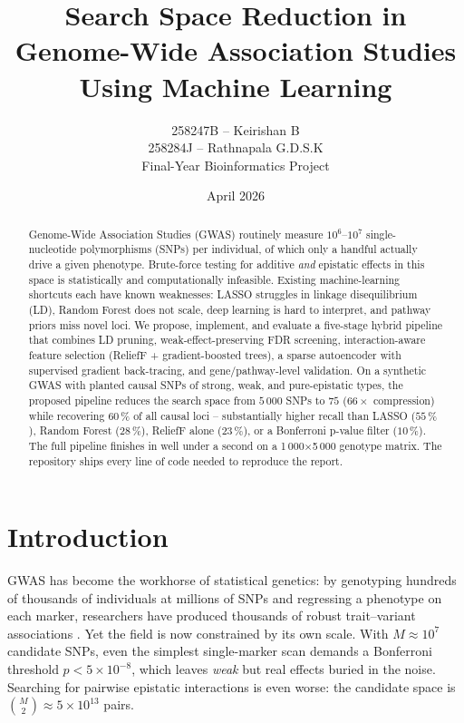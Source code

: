 \documentclass[11pt,a4paper]{article}
\title{\vspace{-1cm}\textbf{Search Space Reduction in Genome-Wide Association Studies\\ Using Machine Learning}}
\author{
  258247B -- Keirishan B \\
  258284J -- Rathnapala G.D.S.K \\[0.5em]
  Final-Year Bioinformatics Project
}
\date{April 2026}
\begin{document}
\maketitle

\begin{abstract}
\noindent
Genome-Wide Association Studies (GWAS) routinely measure $10^6$--$10^7$
single-nucleotide polymorphisms (SNPs) per individual, of which only a
handful actually drive a given phenotype. Brute-force testing for additive
\emph{and} epistatic effects in this space is statistically and
computationally infeasible. Existing machine-learning shortcuts each have
known weaknesses: LASSO struggles in linkage disequilibrium (LD), Random
Forest does not scale, deep learning is hard to interpret, and pathway
priors miss novel loci. We propose, implement, and evaluate a five-stage
hybrid pipeline that combines LD pruning, weak-effect-preserving FDR
screening, interaction-aware feature selection (ReliefF + gradient-boosted
trees), a sparse autoencoder with supervised gradient back-tracing, and
gene/pathway-level validation. On a synthetic GWAS with planted causal
SNPs of strong, weak, and pure-epistatic types, the proposed pipeline
reduces the search space from $5\,000$ SNPs to $75$ ($66\times$
compression) while recovering $60\,\%$ of all causal loci -- substantially
higher recall than LASSO ($55\,\%$), Random Forest ($28\,\%$), ReliefF
alone ($23\,\%$), or a Bonferroni p-value filter ($10\,\%$). The full
pipeline finishes in well under a second on a 1\,000$\times$5\,000
genotype matrix. The repository ships every line of code needed to
reproduce the report.
\end{abstract}

\section{Introduction}
GWAS has become the workhorse of statistical genetics: by genotyping
hundreds of thousands of individuals at millions of SNPs and regressing a
phenotype on each marker, researchers have produced thousands of robust
trait--variant associations \cite{visscher25}. Yet the field is now
constrained by its own scale. With $M \approx 10^7$ candidate SNPs, even
the simplest single-marker scan demands a Bonferroni threshold
$p < 5 \times 10^{-8}$, which leaves \emph{weak} but real effects buried in
the noise. Searching for pairwise epistatic interactions is even worse:
the candidate space is $\binom{M}{2} \approx 5 \times 10^{13}$ pairs.
\end{document}

